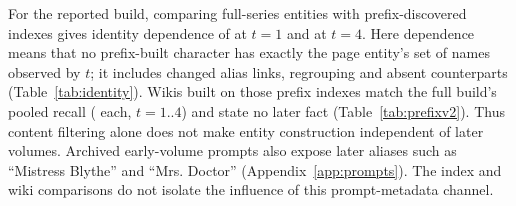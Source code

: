 For the reported build, comparing full-series entities with prefix-discovered indexes
gives identity dependence of  at $t=1$ and
 at $t=4$. Here dependence means that no prefix-built character
has exactly the page entity's set of names observed by $t$; it includes changed alias
links, regrouping and absent counterparts (Table~\ref{tab:identity}). Wikis built on
those prefix indexes match the full build's pooled recall
( each, $t=1..4$) and state no later fact
(Table~\ref{tab:prefixv2}). Thus content filtering alone does not make entity
construction independent of later volumes.
Archived early-volume prompts also expose later aliases such as ``Mistress Blythe'' and
``Mrs. Doctor'' (Appendix~\ref{app:prompts}). The index and wiki comparisons do not isolate
the influence of this prompt-metadata channel.

\ifnwdecon\fi{}
\ifnwheldout\fi{}
